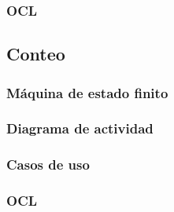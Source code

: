 \subsubsection{OCL}

\subsection{Conteo}

\subsubsection{Máquina de estado finito}

\subsubsection{Diagrama de actividad}

\subsubsection{Casos de uso}


\subsubsection{OCL}